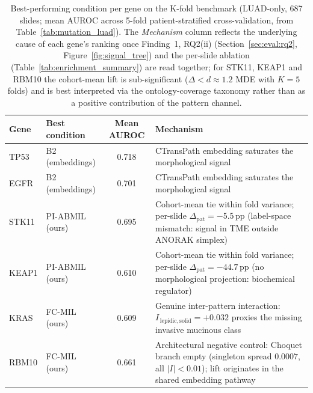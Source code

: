 \begin{table}[ht!]
\centering
\small
\caption[Best-performing condition per gene on the K-fold
benchmark.]{Best-performing condition per gene on the K-fold
benchmark (LUAD-only, 687 slides; mean AUROC across 5-fold
patient-stratified cross-validation, from
Table~\ref{tab:mutation_luad}).
The \emph{Mechanism} column reflects the underlying cause of each
gene's ranking once Finding~1, RQ2(ii)
(Section~\ref{sec:eval:rq2}, Figure~\ref{fig:signal_tree}) and the
per-slide ablation
(Table~\ref{tab:enrichment_summary}) are read together; for
STK11, KEAP1 and RBM10 the cohort-mean lift is sub-significant
($\Delta < d \approx 1.2$ MDE with $K = 5$ folds) and is best
interpreted via the ontology-coverage taxonomy rather than as a
positive contribution of the pattern channel.}
\label{tab:gene_winners}
\begin{tabular}{l l c p{6.4cm}}
\hline
\textbf{Gene} & \textbf{Best condition} & \textbf{Mean AUROC} &
\textbf{Mechanism} \\
\hline
TP53  & B2 (embeddings) & 0.718 &
  CTransPath embedding saturates the morphological signal \\
EGFR  & B2 (embeddings) & 0.701 &
  CTransPath embedding saturates the morphological signal \\
STK11 & PI-ABMIL (ours) & 0.695 &
  Cohort-mean tie within fold variance; per-slide
  $\Delta_{\mathrm{pat}} = -5.5$\,pp (label-space mismatch:
  signal in TME outside ANORAK simplex) \\
KEAP1 & PI-ABMIL (ours) & 0.610 &
  Cohort-mean tie within fold variance; per-slide
  $\Delta_{\mathrm{pat}} = -44.7$\,pp (no morphological
  projection: biochemical regulator) \\
KRAS  & FC-MIL (ours)   & 0.609 &
  Genuine inter-pattern interaction:
  $I_{\,\mathrm{lepidic, solid}} = +0.032$ proxies the missing
  invasive mucinous class \\
RBM10 & FC-MIL (ours)   & 0.661 &
  Architectural negative control: Choquet branch empty
  (singleton spread $0.0007$, all $|I| < 0.01$); lift originates
  in the shared embedding pathway \\
\hline
\end{tabular}
\end{table}

